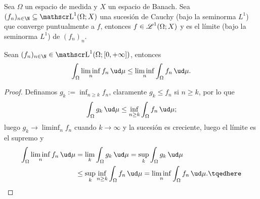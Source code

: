 \begin{cor}\label{thm:L1-limit-is-L1}
	Sea $\Omega$ un espacio de medida y $X$ un espacio de Banach.
	Sea $(f_n)_{n\in\N} \subseteq \LL^1(\Omega; X)$ una sucesión de Cauchy (bajo la seminorma $L^1$) que converge puntualmente a $f$,
	entonces $f \in \operatorname{\mathscr{L}}^1(\Omega; X)$ y es el límite (bajo la seminorma $L^1$) de $(f_n)_n$.
\end{cor}

\begin{lem}[Fatou]
	Sean $(f_n)_{n\in\N} \in \LL^1(\Omega; [0,+\infty])$, entonces
	$$ \int_\Omega \liminf_n f_n\,\ud\mu \le \liminf_n \int_\Omega f_n\,\ud\mu. $$
\end{lem}
\begin{proof}
	Definamos $g_k := \inf_{n\ge k} f_n$, claramente $g_k \le f_n$ si $n\ge k$, por lo que
	$$ \int_\Omega g_k\,\ud\mu \le \inf_{n\ge k} \int_\Omega f_n\,\ud\mu; $$
	luego $g_k \to \liminf_n f_n$ cuando $k \to \infty$ y la sucesión es creciente, luego el límite es el supremo y 
	\begin{align}
		\int_\Omega \liminf_n f_n\,\ud\mu &= \lim_k \int_\Omega g_k\,\ud\mu = \sup_k \int_\Omega g_k\,\ud\mu \notag \\
		&\le \sup_k \inf_{n\ge k} \int_\Omega f_n\,\ud\mu = \liminf_n \int_\Omega f_n\,\ud\mu. \tqedhere
	\end{align}
\end{proof}

